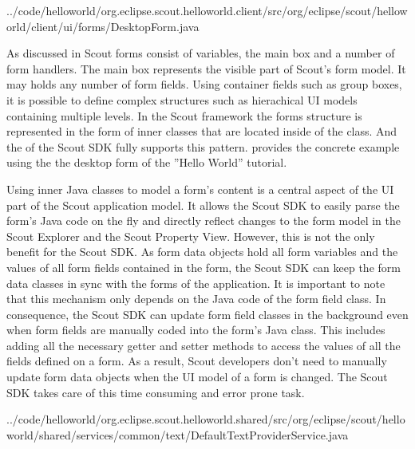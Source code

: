 \documentclass[a4paper,10pt,twoside]{book}
\begin{document}

{../code/helloworld/org.eclipse.scout.helloworld.client/src/org/eclipse/scout/helloworld/client/ui/forms/DesktopForm.java}

As discussed in  Scout forms consist of variables, the main box and a number of form handlers.
The main box represents the visible part of Scout's form model.
It may holds any number of form fields.
Using container fields such as group boxes, it is possible to define complex structures such as hierachical UI models containing multiple levels.
In the Scout framework the forms structure is represented in the form of inner classes that are located inside of the  class.
And the  of the Scout SDK fully supports this pattern.
 provides the concrete example using the the desktop form of the ''Hello World'' tutorial.

Using inner Java classes to model a form's content is a central aspect of the UI part of the Scout application model.
It allows the Scout SDK to easily parse the form's Java code on the fly and directly reflect changes to the form model in the Scout Explorer and the Scout Property View.
However, this is not the only benefit for the Scout SDK.
As form data objects hold all form variables and the values of all form fields contained in the form, the Scout SDK can keep the form data classes in sync with the forms of the application.
It is important to note that this mechanism only depends on the Java code of the form field class.
In consequence, the Scout SDK can update form field classes in the background even when form fields are manually coded into the form's Java class.
This includes adding all the necessary getter and setter methods to access the values of all the fields defined on a form.
As a result, Scout developers don't need to manually update form data objects when the UI model of a form is changed.
The Scout SDK takes care of this time consuming and error prone task.


{../code/helloworld/org.eclipse.scout.helloworld.shared/src/org/eclipse/scout/helloworld/shared/services/common/text/DefaultTextProviderService.java}
\end{document}

